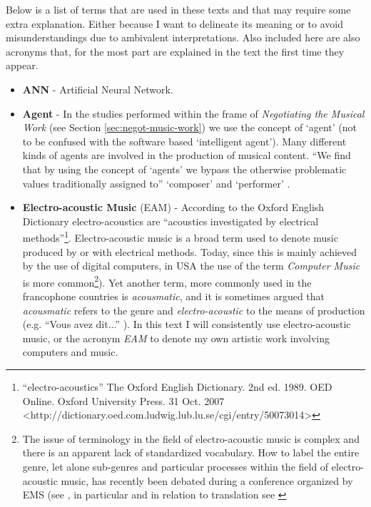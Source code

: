 Below is a list of terms that are used in these texts and that may
require some extra explanation.  Either because I want to delineate
its meaning or to avoid misunderstandings due to ambivalent
interpretations. Also included here are also acronyms
that, for the most part are explained in the text the first time they
appear.

\begin{itemize} %

\item \textbf{ANN} - Artificial Neural Network.

\item \textbf{Agent} - In the studies performed within the frame of
  \emph{Negotiating the Musical Work} (see Section
  \ref{sec:negot-music-work}) we use the concept of `agent' (not to be
  confused with the software based `intelligent agent'). Many
  different kinds of agents are involved in the production of musical
  content. ``We find that by using the concept of `agents' we bypass
  the otherwise problematic values traditionally assigned to''
  `composer' and `performer' \citetext{see also \citealp[p.
    35]{wis96}}.

\item \textbf{Electro-acoustic Music} (EAM) - According to the Oxford
  English Dictionary electro-acoustics are ``acoustics investigated by
  electrical methods''\footnote{``electro-acoustics'' The Oxford
    English Dictionary. 2nd ed. 1989. OED Online. Oxford University
    Press. 31 Oct. 2007
    <http://dictionary.oed.com.ludwig.lub.lu.se/cgi/entry/50073014>}.
  Electro-acoustic music is a broad term used to denote music produced
  by or with electrical methods. Today, since this is mainly achieved
  by the use of digital computers, in USA the use of the term
  \emph{Computer Music} is more common\footnote{The issue of
    terminology in the field of electro-acoustic music is complex and
    there is an apparent lack of standardized vocabulary. How to
    label the entire genre, let alone sub-genres and particular
    processes within the field of electro-acoustic music, has recently
    been debated during a conference organized by EMS (see
    \citealp{EMS06}, in particular \citealp{landy06,dack06,battier06} and
    in relation to translation see \citealp{fields06}}). Yet another
  term, more commonly used in the francophone countries is
  \emph{acousmatic}, and it is sometimes argued that \emph{acousmatic}
  refers to the genre and \emph{electro-acoustic} to the means of
  production (e.g.  ``Vous avez dit...''
  \citeyear{musique-recherche}). In this text I will consistently use
  electro-acoustic music, or the acronym \emph{EAM} to denote my own
  artistic work involving computers and music.
   

\end{itemize}
